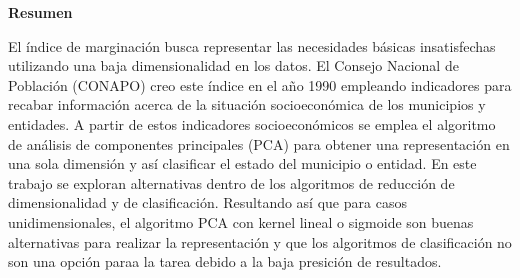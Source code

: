 \begin{center}
    \begin{minipage}{0.8\linewidth}
        \begin{center}
            \changefontsizes{12pt}
            \textbf{Resumen}
        \end{center}
        El índice de marginación busca representar las necesidades básicas insatisfechas utilizando una baja dimensionalidad en los datos. El Consejo Nacional de Población (CONAPO) creo este índice en el año 1990 empleando indicadores para recabar información acerca de la situación socioeconómica de los municipios y entidades. A partir de estos indicadores socioeconómicos se emplea el algoritmo de análisis de componentes principales (PCA) para obtener una representación en una sola dimensión y así clasificar el estado del municipio o entidad. En este trabajo se exploran alternativas dentro de los algoritmos de reducción de dimensionalidad y de clasificación. Resultando así que para casos unidimensionales, el algoritmo PCA con kernel lineal o sigmoide son buenas alternativas para realizar la representación y que los algoritmos de clasificación no son una opción paraa la tarea debido a la baja presición de resultados.
    \end{minipage}
\end{center}